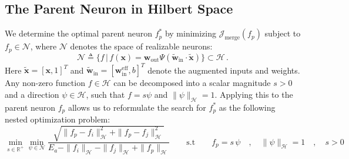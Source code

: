 \documentclass[11pt, a4paper, copyright, gdm]{google}
\newcommand{\normshort}[1]{\lVert#1\rVert}
\newcommand{\wVect}{\boldsymbol{w}}
\newcommand{\xVect}{\boldsymbol{x}}
\newcommand{\calH}{\mathcal{H}}
\newcommand{\calJ}{\mathcal{J}}
\newcommand{\calN}{\mathcal{N}}
\newcommand{\R}{\mathbb{R}}
\theoremstyle{definition}
\begin{document}
\subsection{The Parent Neuron in Hilbert Space}
\label{sec:parent_params}
We determine the optimal parent neuron $f_p^*$ by minimizing $\calJ_{\text{merge}}(f_p)$ subject to $f_p\in \calN$, where $\calN$ denotes the space of realizable neurons:
\begin{equation}
\label{eq:realizable_neurons}
\calN \triangleq \{ f \,|\, f(\xVect) = \wVect_{\text{out}} \Psi(\tilde{\wVect}_{\text{in}} \cdot \tilde{\xVect}) \} \subset \calH \,.
\end{equation}
Here $\tilde{\xVect} = [\xVect, 1]^T$ and $\tilde{\wVect}_{\text{in}} = [\wVect_{\text{in}}^{\text{eff}}, b]^T$ denote the augmented inputs and weights. Any non-zero function $f \in \calH$ can be decomposed into a scalar magnitude $s > 0$ and a direction $\psi \in \calH$, such that $f = s\psi$ and $\|\psi\|_{\calH} = 1$. Applying this to the parent neuron $f_p$ allows us to reformulate the search for $f_p^*$ as the following nested optimization problem:
\begin{equation}
\label{eq:nested}
    \min_{s \in \R^+} \min_{ \psi \in \calN} \frac{\sqrt{\|f_p - f_i\|_{\calH}^2 + \|f_p - f_j\|_{\calH}^2}}{E_a - \|f_i\|_{\calH} - \|f_j\|_{\calH} + \|f_p\|_{\calH}} \qquad \mbox{s.t} \qquad f_p = s \, \psi \quad,\quad \normshort{\psi}_{\calH} = 1 \quad,\quad s>0
\end{equation}
\end{document}
